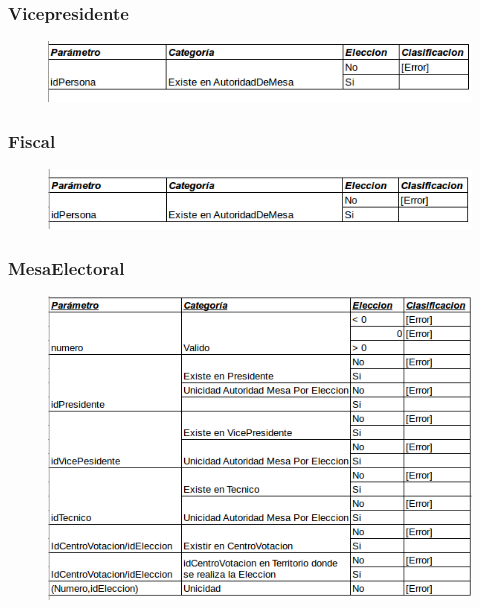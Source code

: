 \subsubsection{Vicepresidente}

\begin{figure}[H]
   \begin{center}
   \includegraphics[scale=0.7]{graphics/vicepresidente.png}
   \label{fig:der}
   \end{center}
\end{figure}


\subsubsection{Fiscal}

\begin{figure}[H]
   \begin{center}
   \includegraphics[scale=0.7]{graphics/fiscal.png}
   \label{fig:der}
   \end{center}
\end{figure}


\subsubsection{MesaElectoral}

\begin{figure}[H]
   \begin{center}
   \includegraphics[scale=0.7]{graphics/mesaelectoral.png}
   \label{fig:der}
   \end{center}
\end{figure}


